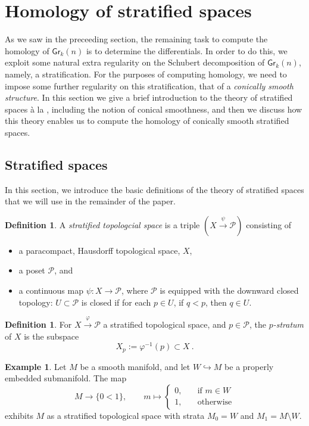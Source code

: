 \documentclass{article}
\newcommand{\mc}[1]{\mathcal{#1}}
\newcommand{\msf}[1]{\mathsf{#1}}
\newcommand{\gr}{\msf{Gr}}
\theoremstyle{definition}
\newtheorem{definition}[theorem]{Definition}
\newtheorem{example}[theorem]{Example}
\begin{document}
\section{Homology of stratified spaces}
\label{sec:stratifications}
As we saw in the preceeding section, the remaining task to compute the homology of $\gr_k(n)$ is to 
determine the differentials. In order to do this, we exploit some natural extra regularity on the Schubert
decomposition of $\gr_k(n)$, namely, 
a stratification. For the purposes of computing homology, we need to impose some further regularity on this stratification, that of a \emph{conically smooth structure}. In this section we give a brief introduction to the theory of stratified spaces 
\`a la \cite{aft1}, including the notion of conical smoothness, and then we
discuss how this theory enables us to compute the homology of conically smooth stratified spaces. \\


\subsection{Stratified spaces}
In this section, we introduce the basic definitions of the theory of stratified spaces that we will use  in the
remainder of the paper. 

\begin{definition}
    A \emph{stratified topologcial space} is a triple $(X \xrightarrow{\psi} \mc{P})$ consisting of
    \begin{itemize}
        \item a paracompact, Hausdorff topological space, $X$,
        \item a poset $\mc{P}$, and
        \item a continuous map $\psi:X \to \mc{P}$, where $\mc{P}$ is equipped with the downward closed topology:
            $U \subset \mc{P}$ is closed if for each $p \in U$, if $q<p$, then $q \in U$.
    \end{itemize}
\end{definition}

\begin{definition}
    For $X \xrightarrow{\varphi} \mc{P}$ a stratified topological space, and $p \in \mc{P}$, the \emph{$p$-stratum} 
    of $X$ is the subspace
    $$X_p :=  \varphi^{-1}(p) \subset X~.$$
\end{definition}

\begin{example}
    Let $M$ be a smooth manifold, and let $W \hookrightarrow M$ be a properly embedded submanifold. The map
    $$M \to \{0<1\}, \qquad m \mapsto \begin{cases} 0, &\quad \text{if } m \in W \\
                                                                                       1, &\quad \text{otherwise}
                                                               \end{cases}$$
    exhibits $M$ as a stratified topological space with strata $M_0 = W$ and $M_1 =M \setminus W$.
\end{example}
\end{document}
